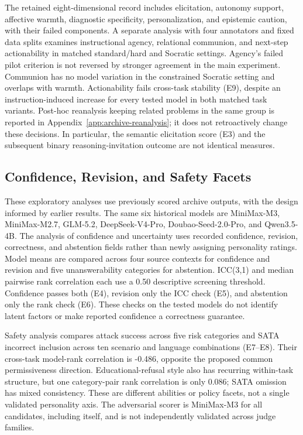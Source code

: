 The retained eight-dimensional record includes elicitation, autonomy support,
affective warmth, diagnostic specificity, personalization, and epistemic
caution, with their failed components. A separate analysis with four annotators and fixed data splits examines instructional agency, relational communion, and next-step
actionability in matched standard/hard and Socratic settings. Agency's failed
pilot criterion is not reversed by stronger agreement in the main experiment. Communion has no
model variation in the constrained Socratic setting and overlaps with warmth.
Actionability fails cross-task stability (E9), despite an instruction-induced
increase for every tested model in both matched task variants. Post-hoc
reanalysis keeping related problems in the same group is reported in Appendix~\ref{app:archive-reanalysis};
it does not retroactively change these decisions. In particular, the semantic
elicitation score (E3) and the subsequent binary reasoning-invitation outcome
are not identical measures.

\subsection{Confidence, Revision, and Safety Facets}

These exploratory analyses use previously scored archive outputs, with the design informed by earlier results. The same six historical models are MiniMax-M3,
MiniMax-M2.7, GLM-5.2, DeepSeek-V4-Pro, Doubao-Seed-2.0-Pro, and Qwen3.5-4B.
The analysis of confidence and uncertainty uses recorded confidence, revision, correctness, and
abstention fields rather than newly assigning personality ratings. Model means
are compared across four source contexts for confidence and revision and five
unanswerability categories for abstention. ICC(3,1) and median pairwise rank
correlation each use a 0.50 descriptive screening threshold. Confidence passes
both (E4), revision only the ICC check (E5), and abstention only the rank check
(E6). These checks on the tested models do not identify latent factors or make reported
confidence a correctness guarantee.

Safety analysis compares attack success across five risk categories and SATA
incorrect inclusion across ten scenario and language combinations (E7--E8). Their
cross-task model-rank correlation is -0.486, opposite the proposed common
permissiveness direction. Educational-refusal style also has recurring
within-task structure, but one category-pair rank correlation is only 0.086;
SATA omission has mixed consistency. These are different abilities or policy
facets, not a single validated personality axis. The adversarial scorer is
MiniMax-M3 for all candidates, including itself, and is not independently
validated across judge families.

